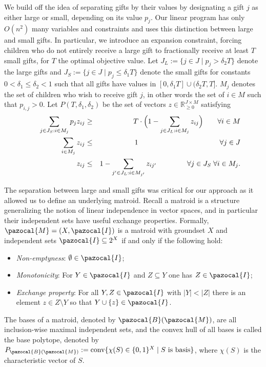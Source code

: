 We build off the idea of separating gifts by their values by designating a gift $j$ as either large or small, depending on its value $p_j$. 
Our linear program has only $O(n^2)$ many variables and constraints and uses this distinction between large and small gifts. 
In particular, we introduce an expansion constraint, 
forcing children who do not entirely receive a large gift to fractionally receive at least $T$ small gifts, 
for $T$ the optimal objective value. Let
$J_L := \{ j \in J \mid p_j > \delta_2 T\}$ denote the large gifts
and $J_S := \{ j \in J \mid p_j \leq \delta_1 T\}$ denote the small gifts
for constants $0 < \delta_1 \leq \delta_2 < 1$ such that
all gifts have values in $[0,\delta_1  T] \cup (\delta_2  T,T]$. 
$M_j$ denotes the set of children who wish to receive gift $j$, in other words the set of $i \in M$ such that $p_{i,j} > 0$.
Let $P(T,\delta_1,\delta_2)$ be the set of vectors $z \in \mathbb{R}_{\geq 0}^{J \times M}$ satisfying
\begin{eqnarray*}\label{eq:CompactLPforSC} \qquad
        \sum\limits_{j \in J_S: i \in M_j} p_j z_{ij} &\geq& T \cdot \Big( 1-\sum_{j \in J_L: i \in M_j} z_{ij}\Big)  \qquad \forall i \in M \\
        \sum\limits_{i \in M_j}z_{ij} &\leq& 1 \hspace{4.0cm} \forall j \in J \\
        z_{ij} &\leq& 1-\sum_{j' \in J_L: i \in M_{j'}} z_{ij'} \hspace{1.5cm} \forall j \in J_S \; \forall i \in M_j.
\end{eqnarray*}


The separation between large and small gifts was critical for our approach as it allowed us to define an underlying matroid.
Recall a matroid is a structure generalizing the notion of linear independence in vector spaces,
and in particular their independent sets have useful exchange properties. 
Formally, $\pazocal{M} = (X,\pazocal{I})$ is a matroid with groundset $X$ and 
independent sets $\pazocal{I} \subseteq 2^X$ if and only if the following hold:
\begin{itemize}
\item \emph{Non-emptyness}: $\emptyset \in \pazocal{I}$; 
\item \emph{Monotonicity}: For $Y \in \pazocal{I}$ and $Z \subseteq Y$ one has $Z \in \pazocal{I}$; 
\item \emph{Exchange property}: For all $Y,Z \in \pazocal{I}$ with $|Y| < |Z|$ there is an element $z \in Z \setminus Y$ so that $Y \cup \{ z\} \in \pazocal{I}$.
\end{itemize}
The bases of a matroid, denoted by $\pazocal{B}(\pazocal{M})$, are all inclusion-wise maximal independent sets, and
the convex hull of all bases is called the base polytope, denoted by $P_{\pazocal{B}(\pazocal{M})} := \text{conv}\{ \chi(S) \in \{0,1\}^X \mid S\text{ is basis}\}$,
where $\chi(S)$ is the characteristic vector of $S$.


